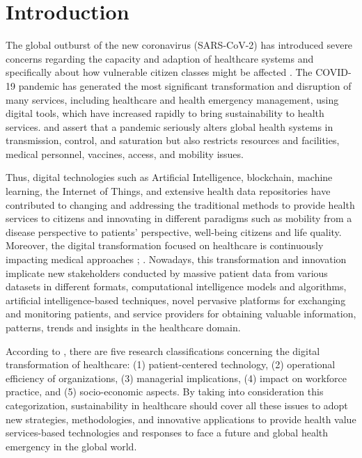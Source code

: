 \documentclass[sustainability,article,submit,pdftex,moreauthors]{Definitions/mdpi}
\begin{document}

\section{Introduction}

The global outburst of the new coronavirus (SARS-CoV-2) has introduced severe concerns regarding the capacity and adaption of healthcare systems and specifically about how vulnerable citizen classes might be affected \citep{lancet2020covid}. The COVID-19 pandemic has generated the most significant transformation and disruption of many services, including healthcare and health emergency management, using digital tools, which have increased rapidly to bring sustainability to health services. \citet{moazzami2020covid} and \citet{katz2020covid} assert that a pandemic seriously alters global health systems in transmission, control, and saturation but also restricts resources and facilities, medical personnel, vaccines, access, and mobility issues. 

Thus, digital technologies such as Artificial Intelligence, blockchain, machine learning, the Internet of Things, and extensive health data repositories have contributed to changing and addressing the traditional methods to provide health services to citizens and innovating in different paradigms such as mobility from a disease perspective to patients’ perspective, well-being citizens and life quality. Moreover, the digital transformation focused on healthcare is continuously impacting medical approaches \citep{sousa2019decision}; \citep{massaro2021digital}. Nowadays, this transformation and innovation implicate new stakeholders conducted by massive patient data from various datasets in different formats, computational intelligence models and algorithms, artificial intelligence-based techniques, novel pervasive platforms for exchanging and monitoring patients, and service providers for obtaining valuable information, patterns, trends and insights in the healthcare domain.

According to \citet{kraus2021digital}, there are five research classifications concerning the digital transformation of healthcare: (1) patient-centered technology, (2) operational efficiency of organizations, (3) managerial implications, (4) impact on workforce practice, and (5) socio-economic aspects. By taking into consideration this categorization, sustainability in healthcare should cover all these issues to adopt new strategies, methodologies, and innovative applications to provide health value services-based technologies and responses to face a future and global health emergency in the global world.
\end{document}
